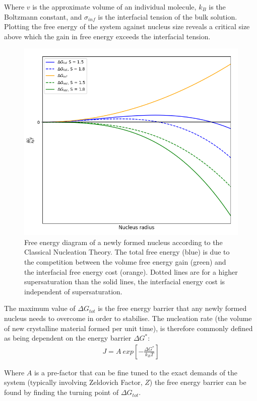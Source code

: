 Where $v$ is the approximate volume of an individual molecule, $k_B$
is the Boltzmann constant, and $\sigma_{inf}$ is the interfacial 
tension of the bulk solution. Plotting the free energy of the system
against nucleus size reveals a critical size above which the gain 
in free energy exceeds the interfacial tension. 
\begin{figure}[h!]
	\centering
	\includegraphics[width=\linewidth]{Free_Energy_Diagram.png}
	\caption{Free energy diagram of a newly formed nucleus according 
		     to the Classical Nucleation Theory. The total free energy (blue)
		     is due to the competition between the volume free energy gain
		     (green) and the interfacial free energy cost (orange). Dotted
		     lines are for a higher supersaturation than the solid lines,
		     the interfacial energy cost is independent of supersaturation.}
	     \label{fig:free_energy}
\end{figure}

The maximum value of $\Delta G_{tot}$ is the free energy barrier 
that any newly formed nucleus needs to overcome in order to stabilise.
The nucleation rate (the volume of new crystalline material formed per
unit time), is therefore commonly defined as being dependent on the 
energy barrier $\Delta G^*$:
\begin{align}
	J = A \ exp \left[-\frac{\Delta G^*}{k_BT} \right]
\end{align}

Where $A$ is a pre-factor that can be fine tuned to the exact demands
of the system (typically involving Zeldovich Factor, $Z$) the free 
energy barrier can be found by finding the turning point of $\Delta G_{tot}$. 

